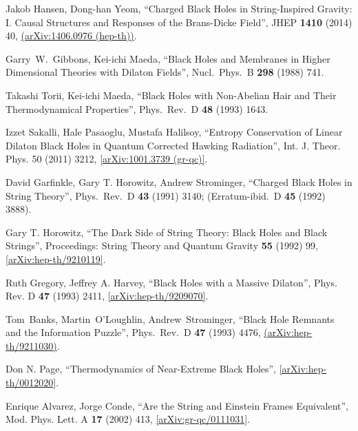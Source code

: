 \documentclass[12pt]{article}
\newcommand{\2}{$^2$}
\newcommand{\3}{$^3$}
\newcommand{\4}{$_4$}
\newcommand{\5}{$_5$}
\begin{document}
\begin{thebibliography}{400}
 Jakob Hansen, Dong-han Yeom,
  ``Charged Black Holes in String-Inspired Gravity: I. Causal Structures and Responses of the Brans-Dicke Field'',
  JHEP {\bf 1410} (2014) 40, \href{http://arxiv.org/abs/1406.0976}{
  (arXiv:1406.0976 (hep-th))}.

  Garry~W.~Gibbons, Kei-ichi Maeda,
  ``Black Holes and Membranes in Higher Dimensional Theories with Dilaton Fields'',
  Nucl.\ Phys.\ B {\bf 298} (1988) 741.

  Takashi Torii, Kei-ichi Maeda,
  ``Black Holes with Non-Abelian Hair and Their Thermodynamical Properties'', 
  Phys.\ Rev.\ D {\bf 48} (1993) 1643.
	
Izzet Sakalli, Hale Pasaoglu, Mustafa Halilsoy,
``Entropy Conservation of Linear Dilaton Black Holes in Quantum Corrected Hawking Radiation'', Int. J. Theor. Phys. 50 (2011) 3212, \href{http://arxiv.org/abs/1001.3739}{[arXiv:1001.3739 (gr-qc)]}.

  David Garfinkle, Gary T. Horowitz, Andrew Strominger,
  ``Charged Black Holes in String Theory'',
  Phys.\ Rev.\ D {\bf 43} (1991) 3140; 
  (Erratum-ibid.\ D {\bf 45} (1992) 3888).
	
Gary T. Horowitz, ``The Dark Side of String Theory: Black Holes and Black Strings'',  Proceedings: String Theory and Quantum Gravity \textbf{55} (1992) 99, \href{http://arxiv.org/abs/hep-th/9210119}{[arXiv:hep-th/9210119]}.

Ruth Gregory, Jeffrey A. Harvey, ``Black Holes with a Massive Dilaton'', Phys. Rev. D \textbf{47} (1993) 2411, \href{http://arxiv.org/abs/hep-th/9209070}{[arXiv:hep-th/9209070]}.

  Tom~Banks, Martin~O'Loughlin, Andrew~Strominger,
  ``Black Hole Remnants and the Information Puzzle'', 
  Phys.\ Rev.\ D {\bf 47} (1993) 4476, \href{http://arxiv.org/abs/hep-th/9211030}{
  (arXiv:hep-th/9211030)}.

Don N. Page, ``Thermodynamics of Near-Extreme Black Holes'', \href{http://arxiv.org/abs/hep-th/0012020}{[arXiv:hep-th/0012020]}.
	
Enrique Alvarez, Jorge Conde, ``Are the String and Einstein Frames Equivalent'', Mod. Phys. Lett. A \textbf{17} (2002) 413, \href{http://arxiv.org/abs/gr-qc/0111031v1}{[arXiv:gr-qc/0111031]}.


\end{thebibliography}
\end{document}

